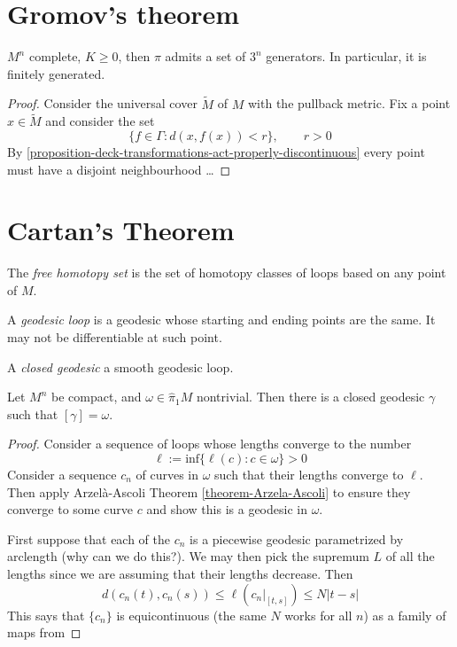 \section{Gromov's theorem}
\label{section-Gromov-theorem}

\begin{theorem}[Gromov]
\label{theorem-Gromov}
$M^n$ complete, $K \geq 0$, then $\pi$ admits a set of $3^n$ generators. In
particular, it is finitely generated.
\end{theorem}

\begin{proof}
Consider the universal cover $\tilde{M}$ of $M$ with the pullback metric. Fix a
point $x \in \tilde{M}$ and consider the set
$$
\{f \in \Gamma:d(x,f(x))<r\},\qquad r>0
$$
By \ref{proposition-deck-transformations-act-properly-discontinuous}
every point must have a disjoint neighbourhood … 
\end{proof}

\section{Cartan's Theorem}
\label{section-Cartan-theorem}

\begin{definition}
\label{definition-free-homotopy-set}
The {\it free homotopy set} is the set of homotopy classes of loops based on any
point of $M$.
\end{definition}

\begin{definition}
\label{definition-geodesic-loop}
A {\it geodesic loop} is a geodesic whose starting and ending points are the
same. It may not be differentiable at such point.
\end{definition}

\begin{definition}
\label{definition-closed-geodesic}
A {\it closed geodesic} a smooth geodesic loop.
\end{definition}

\begin{theorem}[Cartan]
\label{theorem-Cartan}
Let $M^n$ be compact, and $\omega \in \hat{\pi}_1M$ nontrivial. Then there is a
closed geodesic $\gamma$ such that $[\gamma]=\omega$.
\end{theorem}

\begin{proof}
Consider a sequence of loops whose lengths converge to the number
$$
\ell:=\text{inf}\{\ell(c):c \in \omega\}>0
$$
Consider a sequence $c_n$ of curves in $\omega$ such that their lengths converge
to $\ell$. Then apply Arzelà-Ascoli Theorem \ref{theorem-Arzela-Ascoli}
 to ensure they converge to some curve $c$ and show this is a geodesic 
in $\omega$.

First suppose that each of the $c_n$ is a piecewise geodesic parametrized by
arclength (why can we do this?). We may then pick the supremum $L$ of all the
lengths since we are assuming that their lengths decrease. Then
$$
d(c_n(t),c_n(s)) \leq \ell \left(c_n|_{[t,s]}\right) \leq  N |t-s|
$$
This says that $\{c_n\}$ is equicontinuous (the same $N$ works for all $n$) as a
family of maps from 
\end{proof}

